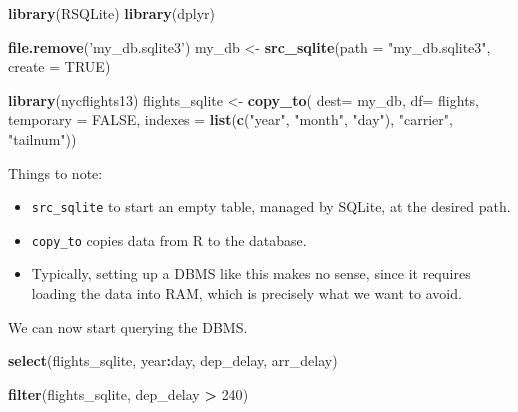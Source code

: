 \documentclass[]{book}
\newenvironment{Shaded}{\begin{snugshade}}{\end{snugshade}}
\newcommand{\DataTypeTok}[1]{\textcolor[rgb]{0.13,0.29,0.53}{#1}}
\newcommand{\DecValTok}[1]{\textcolor[rgb]{0.00,0.00,0.81}{#1}}
\newcommand{\KeywordTok}[1]{\textcolor[rgb]{0.13,0.29,0.53}{\textbf{#1}}}
\newcommand{\NormalTok}[1]{#1}
\newcommand{\OperatorTok}[1]{\textcolor[rgb]{0.81,0.36,0.00}{\textbf{#1}}}
\newcommand{\OtherTok}[1]{\textcolor[rgb]{0.56,0.35,0.01}{#1}}
\newcommand{\StringTok}[1]{\textcolor[rgb]{0.31,0.60,0.02}{#1}}
\providecommand{\tightlist}{%
  \setlength{\itemsep}{0pt}\setlength{\parskip}{0pt}}
\theoremstyle{definition}
\theoremstyle{definition}
\theoremstyle{definition}
\theoremstyle{remark}
\begin{document}
\begin{Shaded}
\begin{Highlighting}[]
\KeywordTok{library}\NormalTok{(RSQLite)}
\KeywordTok{library}\NormalTok{(dplyr)}

\KeywordTok{file.remove}\NormalTok{(}\StringTok{'my_db.sqlite3'}\NormalTok{)}
\NormalTok{my_db <-}\StringTok{ }\KeywordTok{src_sqlite}\NormalTok{(}\DataTypeTok{path =} \StringTok{"my_db.sqlite3"}\NormalTok{, }\DataTypeTok{create =} \OtherTok{TRUE}\NormalTok{)}

\KeywordTok{library}\NormalTok{(nycflights13)}
\NormalTok{flights_sqlite <-}\StringTok{ }\KeywordTok{copy_to}\NormalTok{(}
  \DataTypeTok{dest=}\NormalTok{ my_db, }
  \DataTypeTok{df=}\NormalTok{ flights, }
  \DataTypeTok{temporary =} \OtherTok{FALSE}\NormalTok{, }
  \DataTypeTok{indexes =} \KeywordTok{list}\NormalTok{(}\KeywordTok{c}\NormalTok{(}\StringTok{"year"}\NormalTok{, }\StringTok{"month"}\NormalTok{, }\StringTok{"day"}\NormalTok{), }\StringTok{"carrier"}\NormalTok{, }\StringTok{"tailnum"}\NormalTok{))}
\end{Highlighting}
\end{Shaded}

Things to note:

\begin{itemize}
\tightlist
\item
  \texttt{src\_sqlite} to start an empty table, managed by SQLite, at the desired path.
\item
  \texttt{copy\_to} copies data from R to the database.
\item
  Typically, setting up a DBMS like this makes no sense, since it requires loading the data into RAM, which is precisely what we want to avoid.
\end{itemize}

We can now start querying the DBMS.

\begin{Shaded}
\begin{Highlighting}[]
\KeywordTok{select}\NormalTok{(flights_sqlite, year}\OperatorTok{:}\NormalTok{day, dep_delay, arr_delay)}
\end{Highlighting}
\end{Shaded}

\begin{Shaded}
\begin{Highlighting}[]
\KeywordTok{filter}\NormalTok{(flights_sqlite, dep_delay }\OperatorTok{>}\StringTok{ }\DecValTok{240}\NormalTok{)}
\end{Highlighting}
\end{Shaded}
\end{document}
